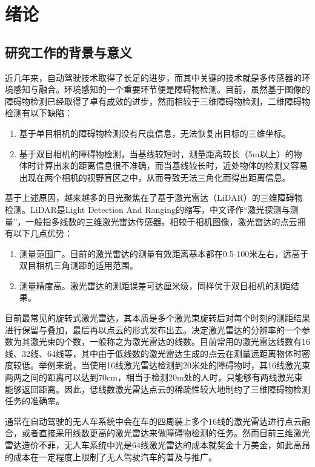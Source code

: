 
\chapter{绪论}
\section{研究工作的背景与意义}
近几年来，自动驾驶技术取得了长足的进步，而其中关键的技术就是多传感器的环境感知与融合。环境感知的一个重要环节便是障碍物检测。目前，虽然基于图像的障碍物检测已经取得了卓有成效的进步，然而相较于三维障碍物检测，二维障碍物检测有以下缺陷：
\begin{enumerate}
    \item 基于单目相机的障碍物检测没有尺度信息，无法恢复出目标的三维坐标。
    \item 基于双目相机的障碍物检测，当基线较短时，测量距离较长（5m以上）的物体时计算出来的距离信息很不准确，而当基线较长时，近处物体的检测又容易出现在两个相机的视野盲区之中，从而导致无法三角化而得出距离信息。
\end{enumerate}

基于上述原因，越来越多的目光聚焦在了基于激光雷达（LiDAR）的三维障碍物检测。LiDAR是Light Detection And Ranging的缩写，中文译作“激光探测与测量”，一般指多线数的三维激光雷达传感器。相较于相机图像，激光雷达的点云拥有以下几点优势：
\begin{enumerate}
    \item 测量范围广。目前的激光雷达的测量有效距离基本都在0.5-100米左右，远高于双目相机三角测距的适用范围。
    \item 测量精度高。激光雷达的测距误差可达厘米级，同样优于双目相机的测距结果。
\end{enumerate}

目前最常见的旋转式激光雷达，其本质是多个激光束旋转后对每个时刻的测距结果进行保留与叠加，最后再以点云的形式发布出去。决定激光雷达的分辨率的一个参数为其激光束的个数，一般称之为激光雷达的线数。目前常用的激光雷达线数有16线、32线、64线等，其中由于低线数的激光雷达生成的点云在测量远距离物体时密度较低。举例来说，当使用16线激光雷达检测到20米处的障碍物时，其16线激光束两两之间的距离可以达到70cm，相当于检测20m处的人时，只能够有两线激光束能够返回距离。因此，低线数激光雷达点云的稀疏性较大地制约了三维障碍物检测任务的准确率。

通常在自动驾驶的无人车系统中会在车的四周装上多个16线的激光雷达进行点云融合，或者直接采用线数更高的激光雷达来做障碍物检测的任务。然而目前三维激光雷达造价不菲，无人车系统中光是64线激光雷达的成本就奖金十万美金，如此高昂的成本在一定程度上限制了无人驾驶汽车的普及与推广。


